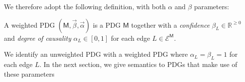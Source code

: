 \documentclass{article}
\newcommand{\Ed}{\mathcal E}
\newcommand{\sfM}{\mathsf M}
\numberwithin{equation}{section}
\begin{document}
	We therefore adopt the following definition, with both $\alpha$ and $\beta$ parameters:

\begin{defn}
	A weighted PDG $(\sfM, \vec \beta, \vec \alpha)$ is a PDG
        $\sfM$ together with a \emph{confidence} $\beta_L \in \mathbb
        R^{\geq 0}$ and \emph{degree of causality} $\alpha_L \in
        [0,1]$ for each edge $L \in \Ed^\sfM$. 
\end{defn}

We identify an unweighted PDG with a weighted PDG where $\alpha_L
= \beta_L = 1$ for each edge $L$.
%
In the next section, we give semantics to PDGs that make use of
these parameters



\end{document}
